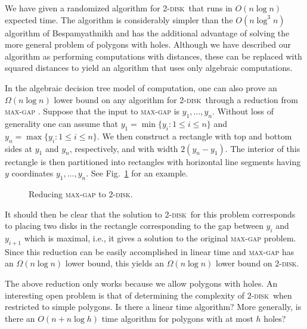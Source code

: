 \documentclass[twoside]{report}
\newcommand{\centeripe}[1]{\begin{center}\Ipe{#1}\end{center}}
\newcommand{\figlabel}[1]{\label{fig:#1}}
\newcommand{\figref}[1]{\mbox{Fig.~\ref{fig:#1}}}
\newcommand{\tdisk}{\textsc{2-disk}}
\begin{document}
\begin{paper}
We have given a randomized algorithm for \tdisk\ that runs in $O(n\log
n)$ expected time. The algorithm is considerably simpler than the
$O(n\log^3 n)$ algorithm of Bespamyathnikh \cite{b02} and has the
additional advantage of solving the more general problem of polygons
with holes.  Although we have described our algorithm as performing
computations with distances, these can be replaced with squared
distances to yield an algorithm that uses only algebraic computations.

In the algebraic decision tree model of computation, one can also
prove an $\Omega(n\log n)$ lower bound on any algorithm for \tdisk\ 
through a reduction from \textsc{max-gap} \cite{ps85}.  Suppose that
the input to \textsc{max-gap} is $y_1,\ldots,y_n$.  Without loss of
generality one can assume that $y_1=\min\{y_i:1\le i\le n\}$ and
$y_n=\max\{y_i:1\le i\le n\}$.  We then construct a rectangle with top
and bottom sides at $y_1$ and $y_n$, respectively, and with width
$2(y_n-y_1)$.  The interior of this rectangle is then partitioned into
rectangles with horizontal line segments having $y$ coordinates
$y_1,\ldots, y_n$.  See \figref{reduction} for an example.

\begin{figure}
\centeripe{reduction}
\caption{Reducing \textsc{max-gap} to \tdisk.}
\figlabel{reduction}
\end{figure}

It should then be clear that the solution to \tdisk\ for this problem
corresponds to placing two disks in the rectangle corresponding to the
gap between $y_i$ and $y_{i+1}$ which is maximal, i.e., it gives a
solution to the original \textsc{max-gap} problem.  Since this
reduction can be easily accomplished in linear time and
\textsc{max-gap} has an $\Omega(n\log n)$ lower bound, this yields an
$\Omega(n\log n)$ lower bound on \tdisk.

The above reduction only works because we allow polygons with
holes. An interesting open problem is that of determining the
complexity of \tdisk\ when restricted to simple polygons.  Is there a
linear time algorithm?  More generally, is there an $O(n+n\log h)$ time
algorithm for polygons with at most $h$ holes?




\end{paper}
\end{document}
